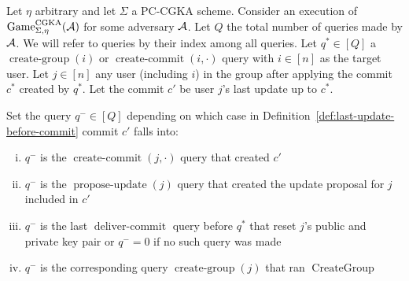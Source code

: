 \begin{definition} \label{def:safe-commit-wrt-user}
	Let $\eta$ arbitrary and let $\Sigma$ a PC-CGKA scheme. Consider an execution of $\mathrm{Game}_{\Sigma, \eta}^{\mathrm{CGKA}}(\mathcal{A})$ for some adversary $\mathcal{A}$. Let $Q$ the total number of queries made by $\mathcal{A}$. We will refer to queries by their index among all queries. Let $q^* \in [Q]$ a $\operatorname{create-group}(i)$ or $\operatorname{create-commit}(i, \cdot)$ query with $i \in [n]$ as the target user. Let $j \in [n]$ any user (including $i$) in the group after applying the commit $c^*$ created by $q^*$. Let the commit $c'$ be user $j$'s last update up to $c^*$.

	Set the query $q^- \in [Q]$ depending on which case in Definition~\ref{def:last-update-before-commit} commit $c'$ falls into:
	\begin{enumerate}[(i)]
		\item $q^-$ is the $\operatorname{create-commit}(j, \cdot)$ query that created $c'$
		\item $q^-$ is the $\operatorname{propose-update}(j)$ query that created the update proposal for $j$ included in $c'$
		\item $q^-$ is the last $\operatorname{deliver-commit}$ query before $q^*$ that reset $j$'s public and private key pair or $q^- = 0$ if no such query was made
		\item $q^-$ is the corresponding query $\operatorname{create-group}(j)$ that ran $\operatorname{CreateGroup}$
	\end{enumerate}



\end{definition}
